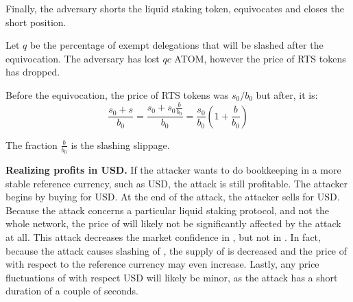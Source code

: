 Finally, the adversary shorts the liquid staking token, equivocates
and closes the short position.

Let $q$ be the percentage of exempt delegations that will be slashed after
the equivocation. The adversary has lost $qc$ ATOM, however the price of RTS
tokens has dropped.

Before the equivocation, the price of RTS tokens was $s_0/b_0$ but
after, it is:
\[
\frac{s_0 + s}{b_0} =
\frac{s_0 + s_0\frac{b}{b_0}}{b_0} =
\frac{s_0}{b_0} (1 + \frac{b}{b_0})
\]

The fraction $\frac{b}{b_0}$ is the slashing slippage.

\noindent
\textbf{Realizing profits in USD.}
If the attacker wants to do bookkeeping in a more stable reference currency,
such as USD, the attack is still profitable. The attacker begins by buying
\asset for USD. At the end of the attack, the attacker sells \asset for USD.
Because the attack concerns a particular liquid staking protocol, and
not the whole \asset network, the price of \asset will likely not
be significantly affected by the attack at all.
This attack decreases the market confidence in \stasset,
but not in \asset.
In fact, because
the attack causes slashing of \asset, the supply of \asset is decreased
and the price of \asset with respect to the reference currency may
even increase.
Lastly, any price fluctuations of \asset with respect USD will likely be
minor, as the attack has a short duration of a couple of seconds.

